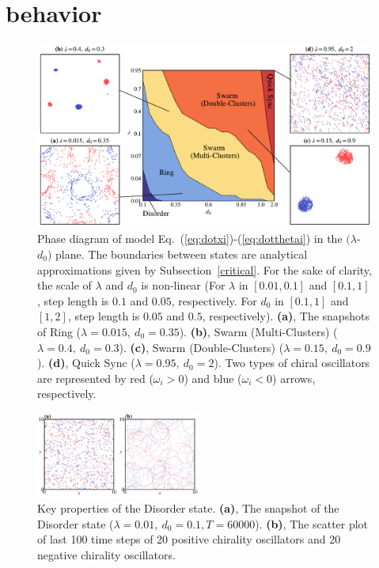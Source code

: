 \documentclass[%
 aip,
 amsmath,amssymb,
 reprint,%
]{revtex4-1}
\begin{document}
\section{behavior}

\begin{figure}
    \includegraphics[width=\textwidth]{./figs/phaseDiagram.pdf}
    \caption{
        \label{fig:phaseDiagram} Phase diagram of model Eq.~(\ref{eq:dotxi})-(\ref{eq:dotthetai}) in the $(\lambda$-$d_0)$ plane. The boundaries between states are analytical approximations given by Subsection~\ref{critical}. 
        For the sake of clarity, the scale of $\lambda$ and $d_0$ is non-linear (For $\lambda$ in $\left[ 0.01, 0.1 \right]$ and $\left[ 0.1, 1 \right]$, step length is $0.1$ and $0.05$, respectively. For $d_0$ in $\left[ 0.1, 1 \right]$ and $\left[ 1, 2 \right]$, step length is $0.05$ and $0.5$, respectively).
        \textbf{(a)}, The snapshots of Ring ($\lambda=0.015,\ d_0=0.35$). 
        \textbf{(b)}, Swarm (Multi-Clusters) ($\lambda=0.4,\ d_0=0.3$).
        \textbf{(c)}, Swarm (Double-Clusters) ($\lambda=0.15,\ d_0=0.9$).
        \textbf{(d)}, Quick Sync ($\lambda=0.95,\ d_0=2$). Two types of chiral oscillators are represented by red ($\omega_i > 0$) and blue 
        ($\omega_i < 0$) arrows, respectively. 
    }
\end{figure}

\begin{figure}[b]
    \includegraphics[width=0.48\textwidth]{./figs/disorderState.pdf}
    \caption{
        \label{fig:disorderState} Key properties of the Disorder state. 
        \textbf{(a)}, The snapshot of the Disorder state ($\lambda=0.01,\ d_0=0.1, T=60000$). 
        \textbf{(b)}, The scatter plot of last 100 time steps of 20 positive chirality oscillators and 20 negative chirality oscillators.
    }
\end{figure}
\end{document}

